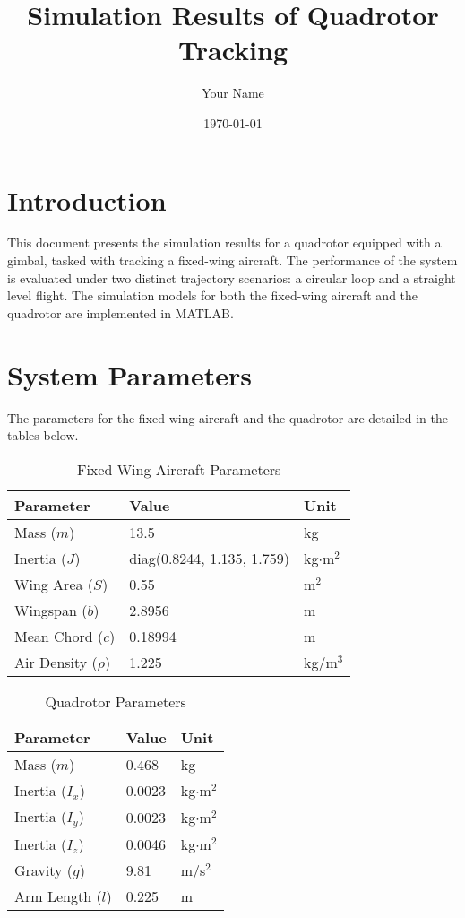 \documentclass{article}
\title{Simulation Results of Quadrotor Tracking}
\author{Your Name}
\date{\today}
\begin{document}
\maketitle

\section{Introduction}
This document presents the simulation results for a quadrotor equipped with a gimbal, tasked with tracking a fixed-wing aircraft. The performance of the system is evaluated under two distinct trajectory scenarios: a circular loop and a straight level flight. The simulation models for both the fixed-wing aircraft and the quadrotor are implemented in MATLAB.

\section{System Parameters}
The parameters for the fixed-wing aircraft and the quadrotor are detailed in the tables below.

\begin{table}[h!]
\centering
\caption{Fixed-Wing Aircraft Parameters}
\label{tab:fw_params}
\begin{tabular}{@{}lll@{}}
\toprule
Parameter & Value & Unit \\ \midrule
Mass ($m$) & 13.5 & kg \\
Inertia ($J$) & diag(0.8244, 1.135, 1.759) & kg$\cdot$m$^2$ \\
Wing Area ($S$) & 0.55 & m$^2$ \\
Wingspan ($b$) & 2.8956 & m \\
Mean Chord ($c$) & 0.18994 & m \\
Air Density ($\rho$) & 1.225 & kg/m$^3$ \\
\bottomrule
\end{tabular}
\end{table}

\begin{table}[h!]
\centering
\caption{Quadrotor Parameters}
\label{tab:quad_params}
\begin{tabular}{@{}lll@{}}
\toprule
Parameter & Value & Unit \\ \midrule
Mass ($m$) & 0.468 & kg \\
Inertia ($I_x$) & 0.0023 & kg$\cdot$m$^2$ \\
Inertia ($I_y$) & 0.0023 & kg$\cdot$m$^2$ \\
Inertia ($I_z$) & 0.0046 & kg$\cdot$m$^2$ \\
Gravity ($g$) & 9.81 & m/s$^2$ \\
Arm Length ($l$) & 0.225 & m \\
\bottomrule
\end{tabular}
\end{table}
\end{document}
